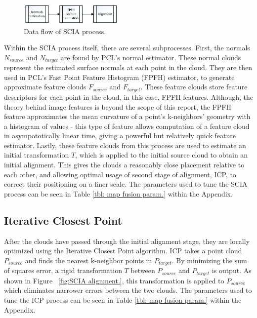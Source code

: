 \documentclass[letterpaper, oneside, 10pt]{report}
\begin{document}
    \begin{figure}[h]
     \caption{Data flow of SCIA process.}
     \centering
       \includegraphics[width=0.45\textwidth]{images/initialalignment}
    \end{figure}

    \noindent Within the SCIA process itself, there are several subprocesses. First, the normals $N_{source}$ and $N_{target}$ are found by PCL's normal estimator. These normal clouds represent the estimated surface normals at each point in the cloud. They are then used in PCL's Fast Point Feature Histogram (FPFH) \cite{rusu2009fast,rusu2009fastlabel} estimator, to generate approximate feature clouds $F_{source}$ and $F_{target}$. These feature clouds store feature descriptors for each point in the cloud, in this case, FPFH features. Although, the theory behind image features is beyond the scope of this report, the FPFH feature approximates the mean curvature of a point's k-neighbors' geometry with a histogram of values - this type of feature allows computation of a feature cloud in asympototically linear time, giving a powerful but relatively quick feature estimator. Lastly, these feature clouds from this process are used to estimate an initial transformation $T$, which is applied to the initial source cloud to obtain an initial alignment. This gives the clouds a reasonably close placement relative to each other, and allowing optimal usage of second stage of alignment, ICP, to correct their positioning on a finer scale. The parameters used to tune the SCIA process can be seen in Table \ref{tbl: map fusion param.} within the Appendix.

    \subsection{Iterative Closest Point}

    \noindent After the clouds have passed through the initial alignment stage, they are locally optimized using the Iterative Closest Point algorithm. ICP takes a point cloud $P_{source}$ and finds the nearest k-neighbor points in $P_{target}$. By minimizing the sum of squares error, a rigid transformation $T$ between $P_{source}$ and $P_{target}$ is output. As shown in Figure ~\ref{fig:SCIA alignment.}, this transformation is applied to $P_{source}$ which eliminates narrower errors between the two clouds. The parameters used to tune the ICP process can be seen in Table \ref{tbl: map fusion param.} within the Appendix.
\end{document}
